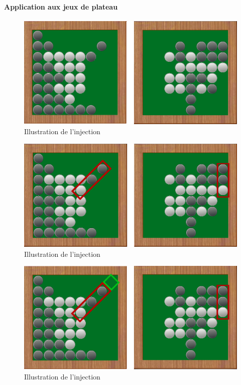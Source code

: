 \paragraph{Application aux jeux de plateau}

\begin{figure}[H] 
\includegraphics[width=\textwidth]{files/raisonneur/cbs_reco0} 
\caption{Illustration de l'injection} 
\label{cbs_reco0}
\end{figure}

\begin{figure}[H] 
\includegraphics[width=\textwidth]{files/raisonneur/cbs_reco1} 
\caption{Illustration de l'injection} 
\label{cbs_reco1}
\end{figure}

\begin{figure}[H] 
\includegraphics[width=\textwidth]{files/raisonneur/cbs_reco2} 
\caption{Illustration de l'injection} 
\label{cbs_reco2}
\end{figure}

